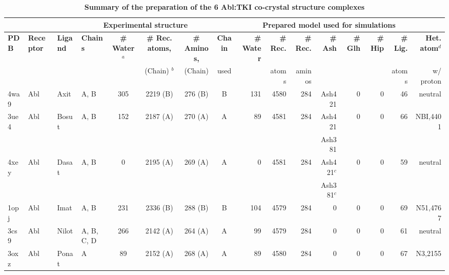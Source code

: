 \documentclass[phd,tocprelim]{cornell}
\begin{document}
\begin{landscape}
\begin{table}
	\footnotesize
	\caption[Summary of the preparation of the 6 Abl:TKI co-crystal structure complexes]{ 
		\label{tab:abl-table-si-9}
		{\bf Summary of the preparation of the 6 Abl:TKI co-crystal structure complexes}
	}
	\setlength{\tabcolsep}{4pt}
	\begin{tabular}{l l l l c c c c r r r r r r r r}
		\toprule
		&				&			& \multicolumn{4}{c}{Experimental structure}	& \multicolumn{9}{c}{Prepared model used for simulations} \\
		\toprule
		{\bf PDB}	& {\bf Receptor}	& {\bf Ligand}	& {\bf Chains}	& {\bf \# Water}$^{a}$	& {\bf \# Rec. atoms,}	& {\bf \# Aminos,}	& {\bf Chain}	& {\bf \# Water}	& {\bf \# Rec.}	& {\bf \# Rec.}	& {\bf \# Ash}	& {\bf \# Glh}	& {\bf \# Hip}	& {\bf \# Lig.}	& {\bf Het. atom}$^{d}$ 	\\
		& 				& 			& 			& 					& {(Chain)}	$^{b}$	& {(Chain)}		& {used}	& 				& {atoms}	& {aminos}	& 			& 			& 			& {atoms}	& {w/ proton}		\\
		\toprule
		4wa9	& {Abl}	& {Axit}	& {A, B}		& {305}	& {2219 (B)}	& {276 (B)}	& {B}	& {131}	& {4580}	& {284}	& {Ash421}			& {0}	& {0}	& {46}	& {neutral} 		\\
		3ue4	& {Abl}	& {Bosut}	& {A, B}		& {152}	& {2187 (A)}	& {270 (A)}	& {A}	& {89}	& {4581}	& {284}	& {Ash421}			& {0}	& {0}	& {66}	& {NBI,4401} 		\\
		& {}	& {}		& {}			& {}	& {}			& {}		& {}	& {}	& {}		& {}	& {Ash381}			& {}	& {}	& {}	& {} 		\\
		4xey	& {Abl}	& {Dasat}	& {A, B}		& {0}	& {2195 (A)}	& {269 (A)}	& {A}	& {0}	& {4581}	& {284}	& {Ash421$^{c}$}		& {0}	& {0}	& {59}	& {neutral} 		\\
		& {}	& {}		& {}			& {}	& {}			& {}		& {}	& {}	& {}		& {}	& {Ash381$^{c}$}	& {}	& {}	& {}	& {} 		\\
		1opj	& {Abl}	& {Imat}	& {A, B}		& {231}	& {2336 (B)}	& {288 (B)}	& {B}	& {104}	& {4579}	& {284}	& {0}				& {0}	& {0}	& {69}	& {N51,4767} 		\\
		3cs9	& {Abl}	& {Nilot}	& {A, B, C, D}	& {266}	& {2142 (A)}	& {264 (A)}	& {A}	& {99}	& {4579}	& {284}	& {0}				& {0}	& {0}	& {61}	& {neutral} 		\\
		3oxz	& {Abl}	& {Ponat}	& {A}			& {89}	& {2152 (A)}	& {268 (A)}	& {A}	& {89}	& {4580}	& {284}	& {0}				& {0}	& {0}	& {67}	& {N3,2155} 		\\
		\bottomrule
	\end{tabular}

\end{table}
\end{landscape}
\end{document}

